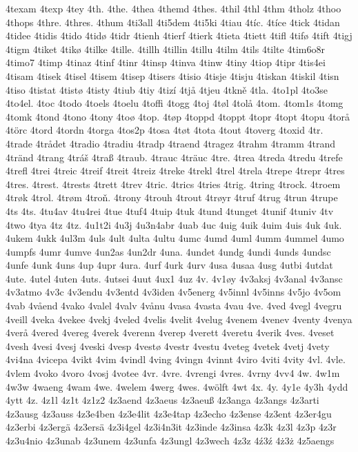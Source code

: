 4texam
4texp
4tey
4th.
4the.
4thea
4themd
4thes.
4thil
4thl
4thm
4tholz
4thoo
4thops
4thre.
4thres.
4thum
4ti3all
4ti5dem
4ti5ki
4tiau
4tíc.
4tíce
4tick
4tidan
4tidee
4tidis
4tido
4tidø
4tidr
4tienh
4tierf
4tierk
4tieta
4tiett
4tifl
4tifø
4tift
4tigj
4tigm
4tiket
4tikø
4tilke
4tille.
4tillh
4tillin
4tillu
4tilm
4tils
4tilte
4tim6o8r
4timo7
4timp
4tinaz
4tinf
4tinr
4tinsp
4tinva
4tinw
4tiny
4tiop
4tipr
4tis4ei
4tisam
4tisek
4tisel
4tisem
4tisep
4tisers
4tisio
4tisje
4tisju
4tiskan
4tiskil
4tisn
4tiso
4tistat
4tistø
4tisty
4tiub
4tiy
4tizí
4tjå
4tjeu
4tkně
4tla.
4to1pl
4to3se
4to4el.
4toc
4todo
4toels
4toelu
4toffi
4togg
4toj
4tøl
4tolå
4tom.
4tom1s
4tomg
4tomk
4tond
4tono
4tony
4toø
4top.
4tøp
4toppd
4toppt
4topr
4topt
4topu
4torå
4törc
4tord
4tordn
4torga
4tos2p
4tosa
4tøt
4tota
4tout
4toverg
4toxid
4tr.
4trade
4trådet
4tradio
4tradiu
4tradp
4traend
4tragez
4trahm
4tramm
4trand
4tränd
4trang
4tráš
4traß
4traub.
4trauc
4träuc
4tre.
4trea
4treda
4tredu
4trefe
4trefl
4trei
4treic
4treif
4treit
4treiz
4treke
4trekl
4trel
4trela
4trepe
4trepr
4tres
4tres.
4trest.
4trests
4trett
4trev
4tric.
4trics
4tries
4trig.
4tring
4trock.
4troem
4trøk
4trol.
4trøm
4troň.
4trony
4trouh
4trout
4trøyr
4truf
4trug
4trun
4trupe
4ts
4ts.
4tu4av
4tu4rei
4tue
4tuf4
4tuip
4tuk
4tund
4tunget
4tunif
4tuniv
4tv
4two
4tya
4tz
4tz.
4u1t2i
4u3j
4u3n4abr
4uab
4uc
4uig
4uik
4uim
4uis
4uk
4uk.
4ukem
4ukk
4ul3m
4uls
4ult
4ulta
4ultu
4umc
4umd
4uml
4umm
4ummel
4umo
4umpfs
4umr
4umve
4un2as
4un2dr
4una.
4undet
4undg
4undi
4unds
4undsc
4unfe
4unk
4uns
4up
4upr
4ura.
4urf
4urk
4urv
4usa
4usaa
4usg
4utbi
4utdat
4ute.
4utel
4uten
4uts.
4utsei
4uut
4ux1
4uz
4v.
4v1øy
4v3aksj
4v3anal
4v3ansc
4v3atmo
4v3c
4v3endu
4v3entd
4v3iden
4v5energ
4v5innl
4v5inns
4v5jo
4v5om
4vab
4våend
4vako
4valel
4valv
4vånu
4vasa
4vasta
4vau
4ve.
4ved
4vegl
4vegru
4veill
4veka
4vekee
4vekj
4veled
4velis
4velit
4velug
4venem
4venev
4venty
4venya
4verå
4vered
4vereg
4verek
4verenn
4verep
4verett
4veretu
4verik
4ves.
4veset
4vesh
4vesi
4vesj
4veski
4vesp
4vestø
4vestr
4vestu
4veteg
4vetek
4vetj
4vety
4vi4na
4vicepa
4vikt
4vim
4vindl
4ving
4vingn
4vinnt
4viro
4viti
4vity
4vl.
4vle.
4vlem
4voko
4voro
4vosj
4votee
4vr.
4vre.
4vrengi
4vres.
4vrny
4vv4
4w.
4w1m
4w3w
4waeng
4wam
4we.
4welem
4werg
4wes.
4wölft
4wt
4x.
4y.
4y1e
4y3h
4ydd
4ytt
4z.
4z1l
4z1t
4z1z2
4z3aend
4z3aeus
4z3aeuß
4z3anga
4z3angs
4z3arti
4z3ausg
4z3auss
4z3e4ben
4z3e4lit
4z3e4tap
4z3echo
4z3ense
4z3ent
4z3er4gu
4z3erbi
4z3ergä
4z3ersä
4z3i4gel
4z3i4n3it
4z3inde
4z3insa
4z3k
4z3l
4z3p
4z3r
4z3u4nio
4z3unab
4z3unem
4z3unfa
4z3ungl
4z3wech
4z3z
4ź3ź
4ż3ż
4z5aengs

